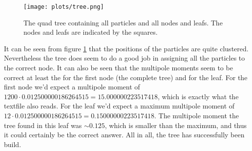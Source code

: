  
 
 \begin{figure}[h]
 \centering
\texttt{[image: plots/tree.png]} 
 \caption{The quad tree containing all particles and all nodes and leafs. The nodes and leafs are indicated by the squares.}
 \label{Tree}
 \end{figure}

It can be seen from figure \ref{Tree} that the positions of the particles are quite clustered. Nevertheless the tree does seem to do a good job in assigning all the particles to the correct node. It can also be seen that the multipole moments seem to be correct at least the for the first node (the complete tree) and for the leaf. For the first node we'd expect a multipole moment of $1200\cdot0.012500000186264515 = 15.000000223517418$, which is exactly what the textfile also reads. For the leaf we'd expect a maximum multipole moment of $12\cdot 0.012500000186264515  = 0.15000000223517418$. The multipole moment the tree found in this leaf was $\sim 0.125$, which is smaller than the maximum, and thus it could certainly be the correct answer. All in all, the tree has successfully been build.

\clearpage